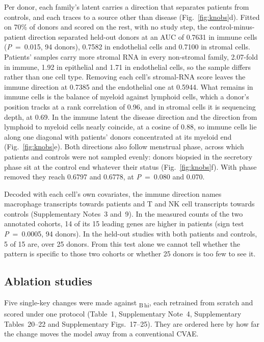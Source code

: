 Per donor, each family's latent carries a direction that separates
patients from controls, and each traces to a source other than disease
(Fig.~\ref{fig:knobs}d).
Fitted on 70\% of donors and scored on the rest, with no study step, the
control-minus-patient direction separated held-out donors at an AUC of
0.7631 in immune cells (\textit{P}~=~0.015, 94 donors), 0.7582 in endothelial
cells and 0.7100 in stromal cells. Patients' samples carry more stromal RNA
in every non-stromal family, 2.07-fold in immune, 1.92 in epithelial and
1.71 in endothelial cells, so the sample differs rather than one cell type.
Removing each cell's stromal-RNA score leaves the immune direction at 0.7385
and the endothelial one at 0.5944. What remains in immune cells is the
balance of myeloid against lymphoid cells, which a donor's position tracks
at a rank correlation of 0.96, and in stromal cells it is sequencing depth,
at 0.69. In the immune latent the disease direction and the direction from
lymphoid to myeloid cells nearly coincide, at a cosine of 0.88, so immune
cells lie along one diagonal with patients' donors concentrated at its
myeloid end (Fig.~\ref{fig:knobs}e). Both directions also follow menstrual
phase, across which patients and controls were not sampled evenly: donors
biopsied in the secretory phase sit at the control end whatever their
status (Fig.~\ref{fig:knobs}f). With phase removed they reach 0.6797 and
0.6778, at \textit{P}~=~0.080 and 0.070.

Decoded with each cell's own covariates, the immune direction names
macrophage transcripts towards patients and T and NK cell transcripts
towards controls (Supplementary Notes~3 and~9). In the measured counts of the two
annotated cohorts, 14 of its 15 leading genes are higher in patients (sign
test \textit{P}~=~0.0005, 94 donors). In the held-out studies with both patients
and controls, 5 of 15 are, over 25 donors. From this test alone we cannot
tell whether the pattern is specific to those two cohorts or whether 25
donors is too few to see it.

\subsection*{Ablation studies}

Five single-key changes were made against \elaj\textsubscript{B\,hi}, each retrained
from scratch and scored under one protocol (Table~1, Supplementary Note~4,
Supplementary Tables~20--22 and Supplementary Figs.~17--25). They are ordered here
by how far the change moves the model away from a conventional CVAE.

